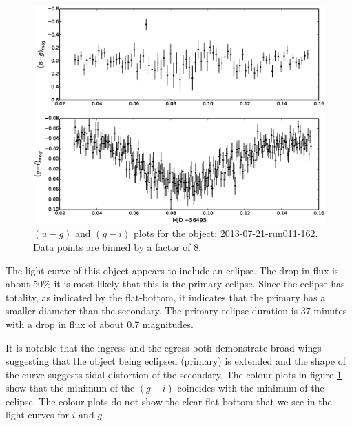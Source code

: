 \begin{figure}
  \center
  \includegraphics[width=120mm]{images/2013-07-21-run011-162_colourcurve-bin8.eps}
  \caption{$(u - g)$ and $(g - i)$ plots for the object: 2013-07-21-run011-162. Data points are binned by a factor of 8.}
  \label{fig:2013-07-21-run011-162-colour}
\end{figure} 

The light-curve of this object appears to include an eclipse.  The drop in flux is about 50\% it is most likely that this is the primary eclipse. Since the eclipse has totality, as indicated by the flat-bottom, it indicates that the primary has a smaller diameter than the secondary. The primary eclipse duration is 37 minutes with a drop in flux of about 0.7 magnitudes. 

It is notable that the ingress and the egress both demonstrate broad wings suggesting that the object being eclipsed (primary) is extended and the shape of the curve suggests tidal distortion of the secondary. The colour plots in figure \ref{fig:2013-07-21-run011-162-colour} show that the minimum of the $(g-i)$ coincides with the minimum of the eclipse. The colour plots do not show the clear flat-bottom that we see in the light-curves for $i$ and $g$. 

